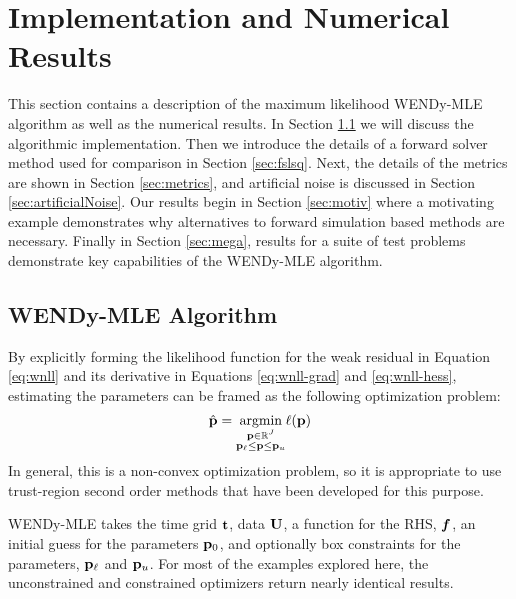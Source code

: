 \section{Implementation and Numerical Results}\label{sec:results}

This section contains a description of the maximum likelihood WENDy-MLE algorithm as well as the numerical results. In Section \ref{sec:wendyAlgo} we will discuss the algorithmic implementation. Then we introduce the details of a forward solver method used for comparison in Section \ref{sec:fslsq}. Next, the details of the metrics are shown in Section \ref{sec:metrics}, and artificial noise is discussed in Section \ref{sec:artificialNoise}. Our results begin in Section \ref{sec:motiv} where a motivating example demonstrates why alternatives to forward simulation based methods are necessary. Finally in Section \ref{sec:mega}, results for a suite of test problems demonstrate key capabilities of the WENDy-MLE algorithm. 

\subsection{WENDy-MLE Algorithm} \label{sec:wendyAlgo}
By explicitly forming the likelihood function for the weak residual in Equation \eqref{eq:wnll} and its derivative in Equations \eqref{eq:wnll-grad} and \eqref{eq:wnll-hess}, estimating the parameters can be framed as the following optimization problem: 
\begin{equation}
	\label{eq:wendyOptim}
	\hat{\mathbf{p}} = \underset{\substack{\mathbf{p} \in \mathbb{R}^J\\ \mathbf{p}_\ell \leq \mathbf{p} \leq \mathbf{p}_u }}{\operatorname{argmin}} \ell(\mathbf{p})
\end{equation}
In general, this is a non-convex optimization problem, so it is appropriate to use trust-region second order methods that have been developed for this purpose.

WENDy-MLE takes the time grid $\mathbf{t}$, data $\mathbf{U}$, a function for the RHS, $\boldsymbol{f}$, an initial guess for the parameters $\mathbf{p}_0$, and optionally box constraints for the parameters, $\mathbf{p}_\ell$ and $\mathbf{p}_u$. For most of the examples explored here, the unconstrained and constrained optimizers return nearly identical results.

